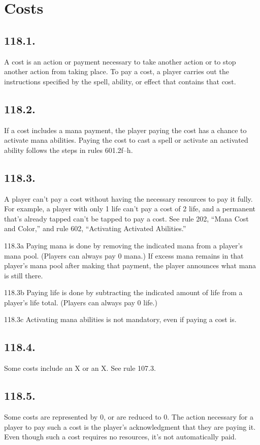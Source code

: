 \section{Costs}
\subsection*{118.1.}
A cost is an action or payment necessary to take another action or to stop another action from taking place. To pay a cost, a player carries out the instructions specified by the spell, ability, or effect that contains that cost.

\subsection*{118.2.}
If a cost includes a mana payment, the player paying the cost has a chance to activate mana abilities. Paying the cost to cast a spell or activate an activated ability follows the steps in rules 601.2f–h.

\subsection*{118.3.}
A player can’t pay a cost without having the necessary resources to pay it fully. For example, a player with only 1 life can’t pay a cost of 2 life, and a permanent that’s already tapped can’t be tapped to pay a cost. See rule 202, “Mana Cost and Color,” and rule 602, “Activating Activated Abilities.”

118.3a Paying mana is done by removing the indicated mana from a player’s mana pool. (Players can always pay 0 mana.) If excess mana remains in that player’s mana pool after making that payment, the player announces what mana is still there.

118.3b Paying life is done by subtracting the indicated amount of life from a player’s life total. (Players can always pay 0 life.)

118.3c Activating mana abilities is not mandatory, even if paying a cost is.

\subsection*{118.4.}
Some costs include an {X} or an X. See rule 107.3.

\subsection*{118.5.}
Some costs are represented by {0}, or are reduced to {0}. The action necessary for a player to pay such a cost is the player’s acknowledgment that they are paying it. Even though such a cost requires no resources, it’s not automatically paid.

